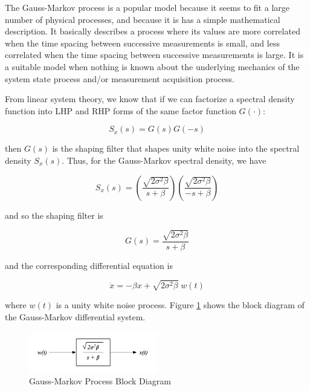 \documentclass[12pt]{article}
\begin{document}
The Gauss-Markov process is a popular model because it seems to fit a large number of
physical processes, and because it is has a simple mathematical description. It basically
describes a process where its values are more correlated when the time spacing between
successive measurements is small, and less correlated when the time spacing between
successive measurements is large. It is a suitable model when nothing is known about the
underlying mechanics of the system state process and/or measurement acquisition process.

From linear system theory, we know that if we can factorize a spectral density function
into LHP and RHP forms of the same factor function $G(\cdot)$:

\begin{equation}
    S_x(s) = G(s) G(-s)
    \label{eq:Spectral-factorization}
\end{equation}

then $G(s)$ is the shaping filter that shapes unity white noise into the spectral density
$S_x(s)$. Thus, for the Gauss-Markov spectral density, we have

\begin{equation}
    S_x(s) = \left ( \frac{\sqrt{2 \sigma^2 \beta}}{s + \beta} \right ) \left ( \frac{\sqrt{2 \sigma^2 \beta}}{-s + \beta} \right )
    \label{eq:GM-spectral-factorization}
\end{equation}

and so the shaping filter is

\begin{equation}
    G(s) = \frac{\sqrt{2 \sigma^2 \beta}}{s + \beta}
    \label{eq:GM-shaping-filter}
\end{equation}

and the corresponding differential equation is

\begin{equation}
    \dot{x} = - \beta x + \sqrt{2 \sigma^2 \beta} \; w(t)
    \label{eq:GM-differential-equation}
\end{equation}

where $w(t)$ is a unity white noise process. Figure \ref{fig:GM-block-diagram} shows
the block diagram of the Gauss-Markov differential system.

\begin{figure}[ht]
    \centering
    \includegraphics[width=0.5\textwidth]{GM-Block-Diagram.png}
    \caption{Gauss-Markov Process Block Diagram}
    \label{fig:GM-block-diagram}
\end{figure}
\end{document}
